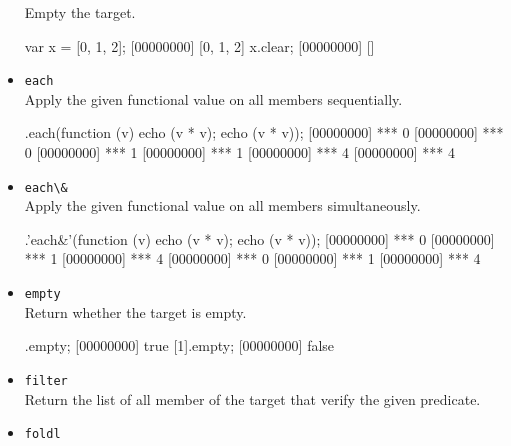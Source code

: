 \begin{itemize}
Empty the target.

\begin{urbiscript}[firstnumber=last]
var x = [0, 1, 2];
[00000000] [0, 1, 2]
x.clear;
[00000000] []
\end{urbiscript}

\item \lstinline|each|\\

Apply the given functional value on all members sequentially.

\begin{urbiscript}[firstnumber=last]
[0, 1, 2].each(function (v) {echo (v * v); echo (v * v)});
[00000000] *** 0
[00000000] *** 0
[00000000] *** 1
[00000000] *** 1
[00000000] *** 4
[00000000] *** 4
\end{urbiscript}

\item \lstinline|each\&|\\

Apply the given functional value on all members simultaneously.

\begin{urbiscript}[firstnumber=last]
[0, 1, 2].'each&'(function (v) {echo (v * v); echo (v * v)});
[00000000] *** 0
[00000000] *** 1
[00000000] *** 4
[00000000] *** 0
[00000000] *** 1
[00000000] *** 4
\end{urbiscript}

\item \lstinline|empty|\\

Return whether the target is empty.

\begin{urbiscript}[firstnumber=last]
[].empty;
[00000000] true
[1].empty;
[00000000] false
\end{urbiscript}

\item \lstinline|filter|\\

Return the list of all member of the target that verify the given
predicate.


\item \lstinline|foldl|\\


\end{itemize}
